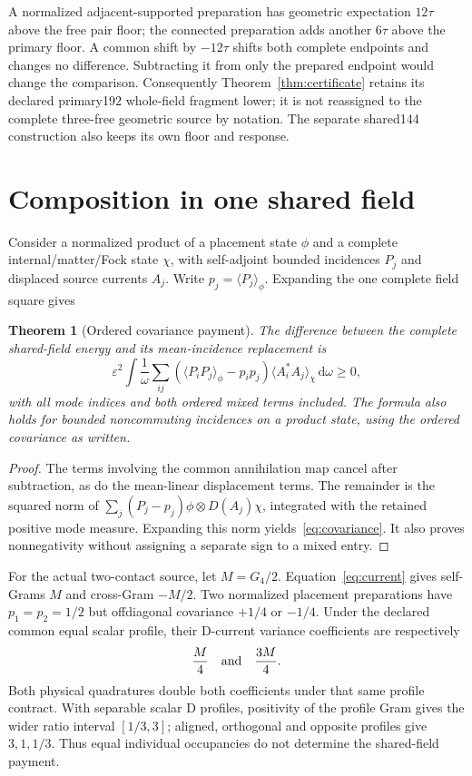 \documentclass[11pt]{article}
\newtheorem{theorem}{Theorem}[section]
\theoremstyle{definition}
\newcommand{\eps}{\varepsilon}
\newcommand{\dd}{\mathrm d}
\begin{document}
A normalized adjacent-supported preparation has geometric expectation $12\tau$ above the free pair floor; the connected preparation adds another $6\tau$ above the primary floor. A common shift by $-12\tau$ shifts both complete endpoints and changes no difference. Subtracting it from only the prepared endpoint would change the comparison. Consequently Theorem~\ref{thm:certificate} retains its declared primary192 whole-field fragment lower; it is not reassigned to the complete three-free geometric source by notation. The separate shared144 construction also keeps its own floor and response.

\section{Composition in one shared field}\label{sec:covariance}

Consider a normalized product of a placement state $\phi$ and a complete internal/matter/Fock state $\chi$, with self-adjoint bounded incidences $P_j$ and displaced source currents $A_j$. Write $p_j=\langle P_j\rangle_\phi$. Expanding the one complete field square gives
\begin{theorem}[Ordered covariance payment]\label{thm:covariance}
The difference between the complete shared-field energy and its mean-incidence replacement is
\begin{equation}\label{eq:covariance}
 \eps^2\int\frac1\omega
 \sum_{ij}\left(\langle P_iP_j\rangle_\phi-p_ip_j\right)
 \langle A_i^*A_j\rangle_\chi\,\dd\omega\geq0,
\end{equation}
with all mode indices and both ordered mixed terms included. The formula also holds for bounded noncommuting incidences on a product state, using the ordered covariance as written.
\end{theorem}
\begin{proof}
The terms involving the common annihilation map cancel after subtraction, as do the mean-linear displacement terms. The remainder is the squared norm of $\sum_j(P_j-p_j)\phi\otimes D(A_j)\chi$, integrated with the retained positive mode measure. Expanding this norm yields~\eqref{eq:covariance}. It also proves nonnegativity without assigning a separate sign to a mixed entry.
\end{proof}

For the actual two-contact source, let $M=G_4/2$. Equation~\eqref{eq:current} gives self-Grams $M$ and cross-Gram $-M/2$. Two normalized placement preparations have $p_1=p_2=1/2$ but offdiagonal covariance $+1/4$ or $-1/4$. Under the declared common equal scalar profile, their D-current variance coefficients are respectively
\begin{equation}\label{eq:factor3}
 \frac M4\quad\hbox{and}\quad\frac{3M}4.
\end{equation}
Both physical quadratures double both coefficients under that same profile contract. With separable scalar D profiles, positivity of the profile Gram gives the wider ratio interval $[1/3,3]$; aligned, orthogonal and opposite profiles give $3,1,1/3$. Thus equal individual occupancies do not determine the shared-field payment.
\end{document}
